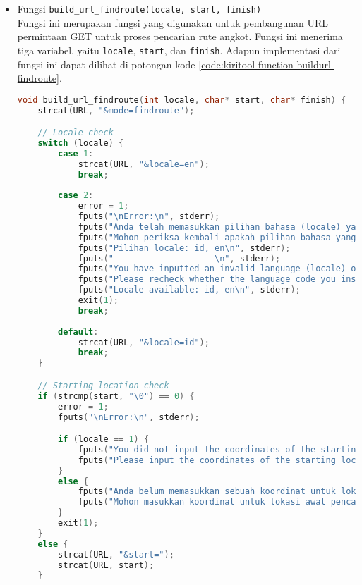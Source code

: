 \begin{itemize}[listparindent=\parindent]
	\item Fungsi \verb|build_url_findroute(locale, start, finish)| \\
	Fungsi ini merupakan fungsi yang digunakan untuk pembangunan URL permintaan	GET untuk proses pencarian rute angkot. Fungsi ini menerima tiga variabel, yaitu \verb|locale|, \verb|start|, dan \verb|finish|. Adapun implementasi dari fungsi ini dapat dilihat di potongan kode \ref{code:kiritool-function-buildurl-findroute}.
	
	\begin{lstlisting}[language=C, caption=Implementasi fungsi build\textunderscore url\textunderscore findroute(), label=code:kiritool-function-buildurl-findroute]
void build_url_findroute(int locale, char* start, char* finish) {
    strcat(URL, "&mode=findroute");

    // Locale check
    switch (locale) {
        case 1:
            strcat(URL, "&locale=en");
            break;
        
        case 2:
            error = 1;
            fputs("\nError:\n", stderr);
            fputs("Anda telah memasukkan pilihan bahasa (locale) yang tidak valid.\n", stderr);
            fputs("Mohon periksa kembali apakah pilihan bahasa yang anda masukkan valid atau tidak.\n", stderr);
            fputs("Pilihan locale: id, en\n", stderr);
            fputs("--------------------\n", stderr);
            fputs("You have inputted an invalid language (locale) option.\n", stderr);
            fputs("Please recheck whether the language code you inserted was supported or not.\n", stderr);
            fputs("Locale available: id, en\n", stderr);
            exit(1);
            break;
        
        default:
            strcat(URL, "&locale=id");
            break;
    }

    // Starting location check
    if (strcmp(start, "\0") == 0) {
        error = 1;
        fputs("\nError:\n", stderr);

        if (locale == 1) {
            fputs("You did not input the coordinates of the starting location.\n", stderr);
            fputs("Please input the coordinates of the starting location through the corresponding option.\n", stderr);
        }
        else {
            fputs("Anda belum memasukkan sebuah koordinat untuk lokasi awal.\n", stderr);
            fputs("Mohon masukkan koordinat untuk lokasi awal pencarian rute melalui opsi yang sesuai.\n", stderr);
        }
        exit(1);
    }
    else {
        strcat(URL, "&start=");
        strcat(URL, start);
    }


\end{lstlisting}
\end{itemize}
